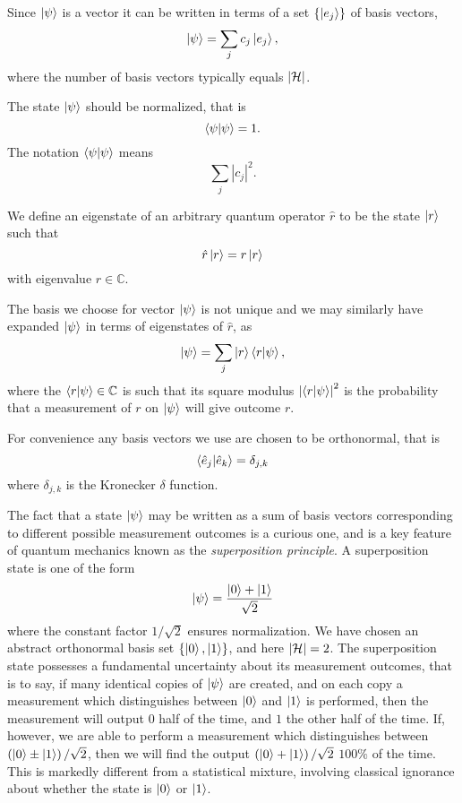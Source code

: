 Since $\ket{\psi}$ is a vector it can be written in terms of a set $\left\{\ket{e_j}\right\}$ of basis vectors,
\begin{equation}
\ket{\psi} = \sum_j c_j \ket{e_j},
\end{equation}
where the number of basis vectors typically equals $\left|\mathcal{H}\right|$. 

The state $\ket{\psi}$ should be normalized, that is
\begin{equation}
\ip{\psi} = 1.
\end{equation}
The notation $\ip{\psi}$ means 
\begin{equation}
\sum_j \left|c_j\right|^2.
\end{equation}

\noindent We define an eigenstate of an arbitrary quantum operator $\hat{r}$ to be the state $\ket{r}$ such that
\begin{equation}
\hat{r} \ket{r} = r \ket{r}
\end{equation}
with eigenvalue $r \in \mathbb{C}$.

The basis we choose for vector $\ket{\psi}$ is not unique and we may similarly have expanded $\ket{\psi}$ in terms of eigenstates of $\hat{r}$, as
\begin{equation}
\ket{\psi} = \sum_j \ket{r}\ip{r}{\psi},
\end{equation}
where the $\ip{r}{\psi} \in \mathbb{C}$ is such that its square modulus $\left|\ip{r}{\psi}\right|^2$ is the probability that a measurement of $r$ on $\ket{\psi}$ will give outcome $r$.

For convenience any basis vectors we use are chosen to be orthonormal, that is
\begin{equation}
\ip{\hat{e}_j}{\hat{e}_k} = \delta_{j, k}
\end{equation}
where $\delta_{j, k}$ is the Kronecker $\delta$ function.

The fact that a state $\ket{\psi}$ may be written as a sum of basis vectors corresponding to different possible measurement outcomes is a curious one, and is a key feature of quantum mechanics known as the \emph{superposition principle}. A superposition state is one of the form
\begin{equation}\label{eqn:intro_superposition}
\ket{\psi} = \frac{\ket{0} + \ket{1}}{\sqrt{2}}
\end{equation}
where the constant factor $1/\sqrt{2}$ ensures normalization. We have chosen an abstract orthonormal basis set $\left\{ \ket{0}, \ket{1}\right\}$, and here $\left|\mathcal{H}\right|=2$. The superposition state possesses a fundamental uncertainty about its measurement outcomes, that is to say, if many identical copies of $\ket{\psi}$ are created, and on each copy a measurement which distinguishes between $\ket{0}$ and $\ket{1}$ is performed, then the measurement will output $0$ half of the time, and $1$ the other half of the time. If, however, we are able to perform a measurement which distinguishes between $\left(\ket{0} \pm \ket{1}\right)/\sqrt{2}$, then we will find the output $\left(\ket{0} + \ket{1}\right)/\sqrt{2}$ $100\%$ of the time. This is markedly different from a statistical mixture, involving classical ignorance about whether the state is $\ket{0}$ or $\ket{1}$. 


